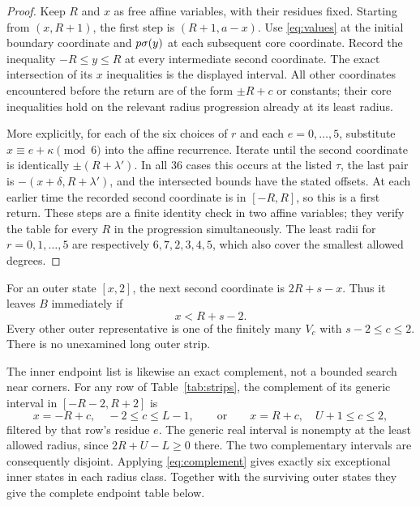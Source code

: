 \begin{proof}
Keep $R$ and $x$ as free affine variables, with their residues fixed.
Starting from $(x,R+1)$, the first step is $(R+1,a-x)$.
Use \eqref{eq:values} at the initial boundary coordinate and
$p\sigma(y)$ at each subsequent core coordinate. Record the inequality
$-R\le y\le R$ at every intermediate second coordinate. The exact
intersection of its $x$ inequalities is the displayed interval.
All other coordinates encountered before the return are of the form
$\pm R+c$ or constants; their core inequalities hold on the relevant
radius progression already at its least radius.

More explicitly, for each of the six choices of $r$ and each
$e=0,\ldots,5$, substitute $x\equiv e+\kappa\pmod6$ into the
affine recurrence. Iterate until the second coordinate is identically
$\pm(R+\lambda')$. In all $36$ cases this occurs at the listed
$\tau$, the last pair is $-(x+\delta,R+\lambda')$, and the
intersected bounds have the stated offsets. At each earlier time the
recorded second coordinate is in $[-R,R]$, so this is a first return.
These steps are a finite identity check in two affine variables;
they verify the table for every $R$ in the progression simultaneously.
The least radii for $r=0,1,\ldots,5$ are respectively
$6,7,2,3,4,5$, which also cover the smallest allowed degrees.
\end{proof}

For an outer state $[x,2]$, the next second coordinate is
$2R+s-x$. Thus it leaves $B$ immediately if
\begin{equation}\label{eq:outer-threshold}
 x<R+s-2.
\end{equation}
Every other outer representative is one of the finitely many
$V_c$ with $s-2\le c\le2$. There is no unexamined long outer strip.

The inner endpoint list is likewise an exact complement, not a
bounded search near corners. For any row of Table~\ref{tab:strips},
the complement of its generic interval in $[-R-2,R+2]$ is
\begin{equation}\label{eq:complement}
 x=-R+c,\quad -2\le c\le L-1,
 \qquad\text{or}\qquad
 x=R+c,\quad U+1\le c\le2,
\end{equation}
filtered by that row's residue $e$. The generic real interval is
nonempty at the least allowed radius, since $2R+U-L\ge0$ there.
The two complementary intervals are consequently disjoint. Applying
\eqref{eq:complement} gives exactly six exceptional inner states in
each radius class. Together with the surviving outer states they
give the complete endpoint table below.

